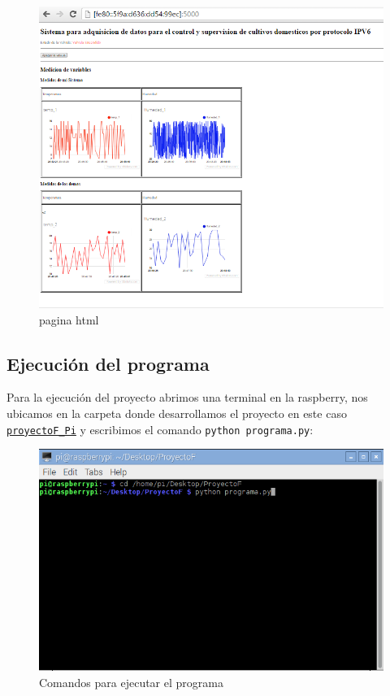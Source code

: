 \documentclass[10pt]{article}\usepackage[]{graphicx}\usepackage[]{color}
\begin{document}
		\begin{figure}[H] 
			\centering
			\includegraphics[scale=0.5]{html3}  
			\caption{pagina html}	
		\end{figure}

\subsection{Ejecución del programa}

Para la ejecución del proyecto abrimos una terminal en la raspberry, nos ubicamos en la carpeta donde desarrollamos el proyecto en este caso \href{https://github.com/wilrilo/repo_final_nube/tree/master/repo_final_nube/ProyectoF_Pi}{\texttt{proyectoF_Pi}} y escribimos el comando \texttt{python programa.py}:

		\begin{figure}[H] 
			\centering
			\includegraphics[scale=0.7]{eje1}  
			\caption{Comandos para ejecutar el programa}	
		\end{figure}
\end{document}
